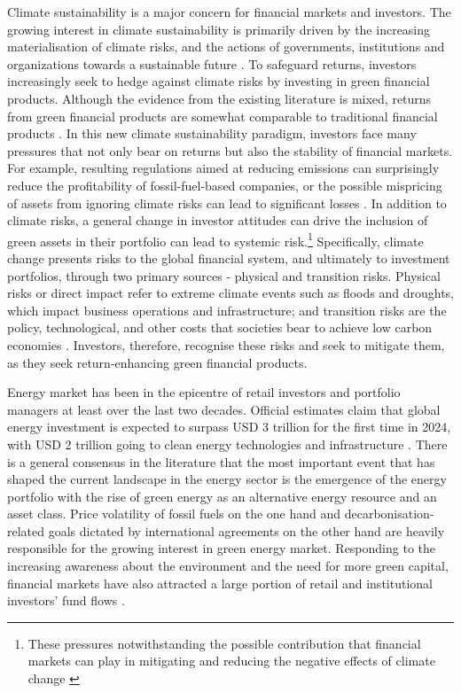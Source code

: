 \documentclass[
  letterpaper,
  DIV=11,
  numbers=noendperiod]{scrartcl}
\begin{document}
Climate sustainability is a major concern for financial markets and
investors. The growing interest in climate sustainability is primarily
driven by the increasing materialisation of climate risks, and the
actions of governments, institutions and organizations towards a
sustainable future \citep{giglio2021a}. To safeguard returns, investors
increasingly seek to hedge against climate risks by investing in green
financial products. Although the evidence from the existing literature
is mixed, returns from green financial products are somewhat comparable
to traditional financial products \citetext{\citealp[see amongst
others,][]{decclesia2024}; \citealp{nguyen2025}; \citealp{pastor2022}; \citealp[and][]{naqvi2022}}.
In this new climate sustainability paradigm, investors face many
pressures that not only bear on returns but also the stability of
financial markets. For example, resulting regulations aimed at reducing
emissions can surprisingly reduce the profitability of fossil-fuel-based
companies, or the possible mispricing of assets from ignoring climate
risks can lead to significant losses \citep{nguyen2025}. In addition to
climate risks, a general change in investor attitudes can drive the
inclusion of green assets in their portfolio can lead to systemic
risk.\footnote{These pressures notwithstanding the possible contribution
  that financial markets can play in mitigating and reducing the
  negative effects of climate change \citep{giglio2021a}} Specifically,
climate change presents risks to the global financial system, and
ultimately to investment portfolios, through two primary sources -
physical and transition risks. Physical risks or direct impact refer to
extreme climate events such as floods and droughts, which impact
business operations and infrastructure; and transition risks are the
policy, technological, and other costs that societies bear to achieve
low carbon economies \citetext{\citealp{nguyen2025}; \citealp[and][
amongst others]{giglio2021a}}. Investors, therefore, recognise these
risks and seek to mitigate them, as they seek return-enhancing green
financial products.

Energy market has been in the epicentre of retail investors and
portfolio managers at least over the last two decades. Official
estimates claim that global energy investment is expected to surpass USD
3 trillion for the first time in 2024, with USD 2 trillion going to
clean energy technologies and infrastructure \citep{iea2024}. There is a
general consensus in the literature that the most important event that
has shaped the current landscape in the energy sector is the emergence
of the energy portfolio with the rise of green energy as an alternative
energy resource and an asset class. Price volatility of fossil fuels on
the one hand and decarbonisation-related goals dictated by international
agreements on the other hand are heavily responsible for the growing
interest in green energy market. Responding to the increasing awareness
about the environment and the need for more green capital, financial
markets have also attracted a large portion of retail and institutional
investors' fund flows \citep{rizvi2022green, naqvi2021there}.
\end{document}
